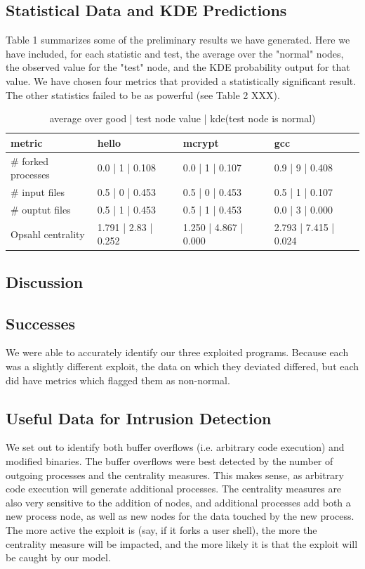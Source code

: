 \documentclass[10pt,twocolumn]{article}
\begin{document}
\subsection{Statistical Data and KDE Predictions}
Table 1 summarizes some of the preliminary results we have generated. Here we have included, for each statistic and test, the average over the "normal" nodes, the observed value for the "test" node, and the KDE probability output for that value. We have chosen four metrics that provided a statistically significant result. The other statistics failed to be as powerful (see Table 2 XXX).
\begin{center}
\begin{table}[ht]
{\small
  \begin{tabular}{| l | l | l | l |}
    \hline
    metric & hello & mcrypt & gcc \\ \hline
     \# forked processes & 0.0 | 1 | 0.108 & 0.0 | 1 | 0.107 & 0.9 | 9 | 0.408 \\ \hline
     \# input files & 0.5 | 0 | 0.453 & 0.5 | 0 | 0.453 & 0.5 | 1 | 0.107 \\ \hline
     \# ouptut files & 0.5 | 1 | 0.453 & 0.5 | 1 | 0.453 & 0.0 | 3 | 0.000 \\ \hline
    Opsahl centrality & 1.791 | 2.83 | 0.252 & 1.250 | 4.867 | 0.000 & 2.793 | 7.415 | 0.024 \\
    \hline
  \end{tabular}
}
\hfill{}
\caption{average over good | test node value | kde(test node is normal)
}
\label{tb:tablename}
\end{table}
\end{center}

\subsection{Discussion}
\subsection{Successes}
We were able to accurately identify our three exploited programs. Because each was a slightly different exploit, the data on which they deviated differed, but each did have metrics which flagged them as non-normal. 
\subsection{Useful Data for Intrusion Detection}
We set out to identify both buffer overflows (i.e. arbitrary code execution) and modified binaries. The buffer overflows were best detected by the number of outgoing processes and the centrality measures. This makes sense, as arbitrary code execution will generate additional processes. The centrality measures are also very sensitive to the addition of nodes, and additional processes add both a new process node, as well as new nodes for the data touched by the new process. The more active the exploit is (say, if it forks a user shell), the more the centrality measure will be impacted, and the more likely it is that the exploit will be caught by our model.
\end{document}
